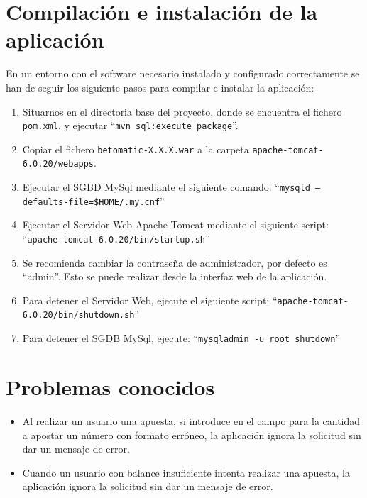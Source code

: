 \documentclass[a4paper,twoside]{article}
\begin{document}
\section{Compilación e instalación de la aplicación}

En un entorno con el software necesario instalado y configurado correctamente se han de seguir los siguiente pasos para compilar e instalar la aplicación:

\begin{enumerate}
\item Situarnos en el directoria base del proyecto, donde se encuentra el fichero {\tt pom.xml}, y ejecutar ``{\tt mvn sql:execute package}''.
\item Copiar el fichero {\tt betomatic-X.X.X.war} a la carpeta {\tt apache-tomcat-6.0.20/webapps}.
\item Ejecutar el SGBD MySql mediante el siguiente comando: ``{\tt mysqld --defaults-file=\$HOME/.my.cnf}''
\item Ejecutar el Servidor Web Apache Tomcat mediante el siguiente script: ``{\tt apache-tomcat-6.0.20/bin/startup.sh}''
\item Se recomienda cambiar la contraseña de administrador, por defecto es ``admin''. Esto se puede realizar desde la interfaz web de la aplicación.
\item Para detener el Servidor Web, ejecute el siguiente script: ``{\tt apache-tomcat-6.0.20/bin/shutdown.sh}''
\item Para detener el SGDB MySql, ejecute: ``{\tt mysqladmin -u root shutdown}''
\end{enumerate}


\section{Problemas conocidos}

\begin{itemize}
\item Al realizar un usuario una apuesta, si introduce en el campo para la cantidad a apostar un número con formato erróneo, la aplicación ignora la solicitud sin dar un mensaje de error.
\item Cuando un usuario con balance insuficiente intenta realizar una apuesta, la aplicación ignora la solicitud sin dar un mensaje de error.
\end{itemize}
\end{document}
